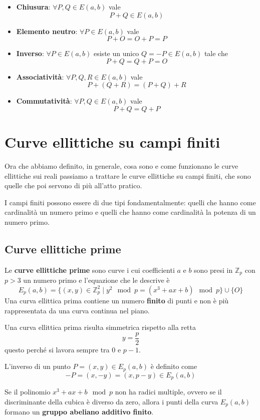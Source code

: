 \begin{itemize}
	\item \textbf{Chiusura}: $\forall P, Q \in E(a, b)$ vale
	      \[ P + Q \in E(a, b) \]
	\item \textbf{Elemento neutro}: $\forall P \in E(a, b)$ vale
	      \[ P + O = O + P = P \]
	\item \textbf{Inverso}: $\forall P \in E(a, b)$ esiste un unico $Q = -P \in E(a, b)$ tale che
	      \[ P + Q = Q + P = O \]
	\item \textbf{Associativit\`a}: $\forall P, Q, R \in E(a, b)$ vale
	      \[ P + (Q + R) = (P + Q) + R \]
	\item \textbf{Commutativit\`a}: $\forall P, Q \in E(a, b)$ vale
	      \[ P + Q = Q + P \]
\end{itemize}

\section{Curve ellittiche su campi finiti}
Ora che abbiamo definito, in generale, cosa sono e come funzionano le curve ellittiche sui reali passiamo a trattare
le curve ellittiche su campi finiti, che sono quelle che poi servono di pi\`u all'atto pratico.

I campi finiti possono essere di due tipi fondamentalmente: quelli che hanno come cardinalit\`a un numero primo e
quelli che hanno come cardinalit\`a la potenza di un numero primo.

\subsection{Curve ellittiche prime}
Le \textbf{curve ellittiche prime} sono curve i cui coefficienti $a$ e $b$ sono presi in $\mathbb{Z}_p$ con $p > 3$
un numero primo e l'equazione che le descrive \`e
\[ E_p(a, b) = 	\{ (x, y) \in \mathbb{Z}_p^2 \mid y^2 \mod{p} = (x^3 + ax + b) \mod{p} \} \cup \{ O \} \]
Una curva ellittica prima contiene un numero \textbf{finito} di punti e non \`e pi\`u rappresentata da una curva
continua nel piano.

Una curva ellittica prima risulta simmetrica rispetto alla retta
\[ y = \frac{p}{2} \]
questo perch\'e si lavora sempre tra 0 e $p - 1$.

L'inverso di un punto $P = (x, y) \in E_p(a, b)$ \`e definito come
\[ -P = (x, -y) = (x, p - y) \in E_p(a, b) \]

Se il polinomio $x^3 + ax + b \mod{p}$ non ha radici multiple, ovvero se il discriminante della cubica \`e diverso
da zero, allora i punti della curva $E_p(a, b)$ formano un \textbf{gruppo abeliano additivo finito}.

